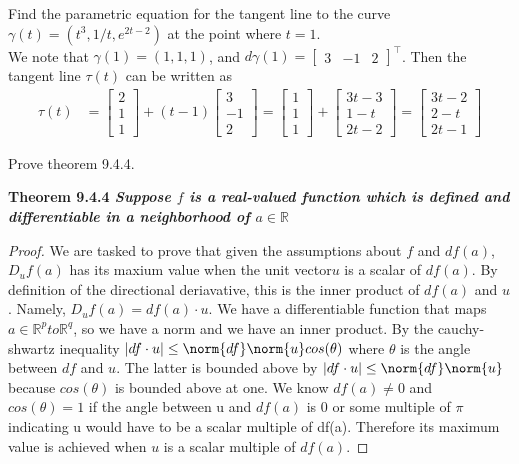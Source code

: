 \documentclass[12pt]{book}
\newcommand{\R}{\mathbb{R}}
\newenvironment{exercise}[2][Exercise]{\begin{trivlist}
\item[\hskip \labelsep {\bfseries #1}\hskip \labelsep {\bfseries #2.}]}{\end{trivlist}}
\begin{document}
\begin{exercise}{9.4.3}
    Find the parametric equation for the tangent line to the curve $\gamma(t) = \left( t^3, 1/t, e^{2t-2}\right)$ at the point where $t=1$. \\

    We note that $\gamma(1) = (1,1,1)$, and $d\gamma(1) = \begin{bmatrix} 3 & -1 & 2 \end{bmatrix}^\intercal$. Then the tangent line $\tau(t)$ can be written as
        \begin{align*}
            \tau(t) &= \begin{bmatrix} 2 \\ 1\\1 \end{bmatrix} + (t-1) \begin{bmatrix} 3 \\ -1 \\ 2 \end{bmatrix} = \begin{bmatrix} 1 \\ 1\\1 \end{bmatrix} + \begin{bmatrix} 3 t - 3 \\ 1 - t\\ 2 t - 2 \end{bmatrix} = \begin{bmatrix} 3t -2 \\ 2- t \\ 2 t - 1 \end{bmatrix}
        \end{align*}
\end{exercise}

\begin{exercise}{9.4.5} Prove theorem 9.4.4. 

\bf{Theorem 9.4.4} \emph{Suppose $f$ is a real-valued function which is defined and differentiable in a neighborhood of $a\in \R$}

\begin{proof}
We are tasked to prove that given the assumptions about $f$ and $df(a)$, $D_uf(a)$ has its maxium value when the unit vector$u$ is a scalar of $df(a)$. By definition of the directional deriavative, this is the inner product of $df(a)$ and $u$. Namely, $D_uf(a) = df(a) \cdot u$. We have a differentiable function that maps $a\in \R^p to \R^q$, so we have a norm and we have an inner product. By the cauchy-shwartz inequality $|df \cdot u| \leq \norm{df} \norm{u} cos(\theta)$ where $\theta$ is the angle between $df$ and $u$. The latter is bounded above by $|df \cdot u| \leq \norm{df}  \norm{u}$ because $cos(\theta)$ is bounded above at one. We know $df(a) \neq 0$ and $cos(\theta) = 1$ if the angle between u and $df(a)$ is 0 or some multiple of $\pi$ indicating u would have to be a scalar multiple of df(a). Therefore its maximum value is achieved when $u$ is a scalar multiple of $df(a)$. 


\end{proof}
\end{exercise}
\end{document}
